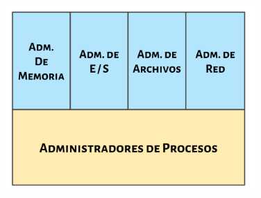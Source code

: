 \documentclass[12pt, fleqn]{report}                             %
\begin{document}
            \begin{figure}[h!]
                \centering
                \includegraphics[width=0.85\textwidth]{PartesDelKernel}
            \end{figure}
\end{document}
